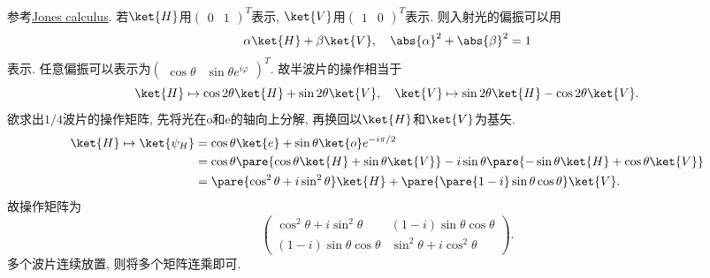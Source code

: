 \documentclass{ctexart}
\begin{document}
参考\href{https://en.wikipedia.org/wiki/Jones_calculus}{Jones calculus}. 若$\ket{H}$用$\begin{pmatrix}
    0 & 1
\end{pmatrix}^T$表示, $\ket{V}$用$\begin{pmatrix}
    1 & 0
\end{pmatrix}^T$表示. 则入射光的偏振可以用
\[ \alpha \ket{H} + \beta\ket{V},\quad \abs{\alpha}^2 + \abs{\beta}^2 = 1 \]
表示. 任意偏振可以表示为$\begin{pmatrix}
    \cos\theta & \sin\theta e^{i\varphi}
\end{pmatrix}^T$. 故半波片的操作相当于
\[ \ket{H} \mapsto \cos 2\theta \ket{H} + \sin 2\theta\ket{V},\quad \ket{V} \mapsto \sin 2\theta \ket{H} - \cos 2\theta \ket{V}. \]
欲求出$1/4$波片的操作矩阵, 先将光在o和e的轴向上分解, 再换回以$\ket{H}$和$\ket{V}$为基矢.
\begin{align*}
    \ket{H} \mapsto \ket{\psi_H} &= \cos \theta \ket{e} + \sin\theta \ket{o} e^{-i\pi/2} \\
    &= \cos\theta \pare{\cos\theta \ket{H} + \sin\theta\ket{V}} - i\sin\theta\pare{-\sin\theta \ket{H} + \cos\theta\ket{V}} \\
    &= \pare{\cos^2\theta + i\sin^2\theta}\ket{H} + \pare{\pare{1-i}\sin\theta\cos\theta}\ket{V}.
\end{align*}
故操作矩阵为
\[ \begin{pmatrix}
  \cos^2\theta + i\sin^2\theta & (1 - i)\sin\theta \cos\theta \\
  (1 - i)\sin\theta \cos\theta & \sin^2\theta + i\cos^2\theta
\end{pmatrix}. \]
多个波片连续放置, 则将多个矩阵连乘即可.
\end{document}
